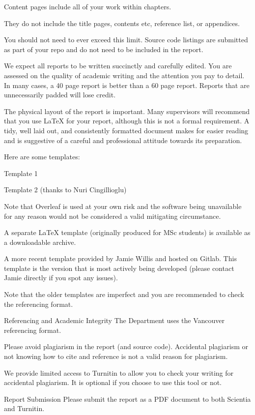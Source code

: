 Content pages include all of your work within chapters.

They do not include the title pages, contents etc, reference list, or appendices.

You should not need to ever exceed this limit. Source code listings are submitted as part of your repo and do not need to be included in the report.

We expect all reports to be written succinctly and carefully edited. You are assessed on the quality of academic writing and the attention you pay to detail. In many cases, a 40 page report is better than a 60 page report. Reports that are unnecessarily padded will lose credit.

The physical layout of the report is important. Many supervisors will recommend that you use LaTeX for your report, although this is not a formal requirement. A tidy, well laid out, and consistently formatted document makes for easier reading and is suggestive of a careful and professional attitude towards its preparation.

Here are some templates:

Template 1

Template 2 (thanks to Nuri Cingillioglu)

Note that Overleaf is used at your own risk and the software being unavailable for any reason would not be considered a valid mitigating circumstance.

A separate LaTeX template (originally produced for MSc students) is available as a downloadable archive.

A more recent template provided by Jamie Willis and hosted on Gitlab. This template is the version that is most actively being developed (please contact Jamie directly if you spot any issues).

Note that the older templates are imperfect and you are recommended to check the referencing format.

Referencing and Academic Integrity
The Department uses the Vancouver referencing format.

Please avoid plagiarism in the report (and source code). Accidental plagiarism or not knowing how to cite and reference is not a valid reason for plagiarism.

We provide limited access to Turnitin to allow you to check your writing for accidental plagiarism. It is optional if you choose to use this tool or not.

Report Submission
Please submit the report as a PDF document to both Scientia and Turnitin.

